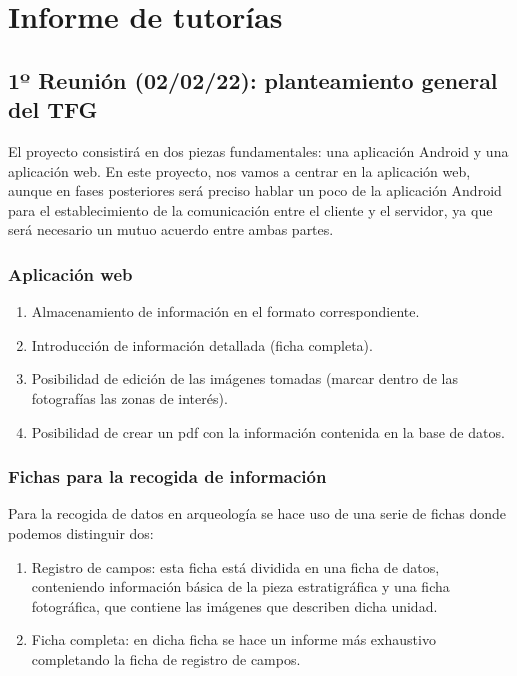\chapter{Informe de tutorías} \label{ch:meetings}
\section{1º Reunión (02/02/22): planteamiento general del TFG}
El proyecto consistirá en dos piezas fundamentales: una aplicación Android y una 
aplicación web. En este proyecto, nos vamos a centrar en la aplicación web, aunque en
fases posteriores será preciso hablar un poco de la aplicación Android para el establecimiento
de la comunicación entre el cliente y el servidor, ya que será necesario un mutuo acuerdo
entre ambas partes.

    \subsection{Aplicación web}

        \begin{enumerate}
            \item Almacenamiento de información en el formato correspondiente.
            \item Introducción de información detallada (ficha completa).
            \item Posibilidad de edición de las imágenes tomadas (marcar dentro de las
            fotografías las zonas de interés).
            \item Posibilidad de crear un pdf con la información contenida en la base de
            datos.
        \end{enumerate}

    \subsection{Fichas para la recogida de información}
    Para la recogida de datos en arqueología se hace uso de una serie de fichas donde podemos
    distinguir dos:

        \begin{enumerate}
            \item Registro de campos: esta ficha está dividida en una ficha de datos,
            conteniendo información básica de la pieza estratigráfica y una ficha fotográfica,
            que contiene las imágenes que describen dicha unidad.
            \item Ficha completa: en dicha ficha se hace un informe más exhaustivo completando
            la ficha de registro de campos.
        \end{enumerate}

